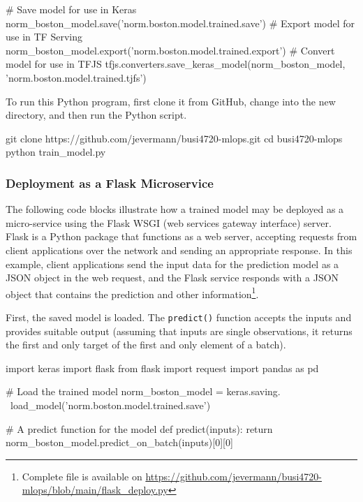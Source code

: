 \begin{withcode}
\begin{pythoncode}
# Save model for use in Keras
norm_boston_model.save('norm.boston.model.trained.save')
# Export model for use in TF Serving
norm_boston_model.export('norm.boston.model.trained.export')
# Convert model for use in TFJS
tfjs.converters.save_keras_model(norm_boston_model,
    'norm.boston.model.trained.tjfs')
\end{pythoncode}

To run this Python program, first clone it from GitHub, change into the new directory, and then run the Python script.

\begin{bashcode}
git clone https://github.com/jevermann/busi4720-mlops.git
cd busi4720-mlops
python train_model.py
\end{bashcode}

\subsubsection*{Deployment as a Flask Microservice}

The following code blocks illustrate how a trained model may be deployed as a micro-service using the Flask WSGI (web services gateway interface) server. Flask is a Python package that functions as a web server, accepting requests from client applications over the network and sending an appropriate response. In this example, client applications send the input data for the prediction model as a JSON object in the web request, and the Flask service responds with a JSON object that contains the prediction and other information\footnote{Complete file is available on \url{https://github.com/jevermann/busi4720-mlops/blob/main/flask_deploy.py}}.

First, the saved model is loaded. The \texttt{predict()} function accepts the inputs and provides suitable output (assuming that inputs are single observations, it returns the first and only target of the first and only element of a batch).

\begin{pythoncode}
import keras
import flask
from flask import request
import pandas as pd

# Load the trained model
norm_boston_model = keras.saving. \
    load_model('norm.boston.model.trained.save')

# A predict function for the model
def predict(inputs):
    return norm_boston_model.predict_on_batch(inputs)[0][0]
\end{pythoncode}


\end{withcode}
